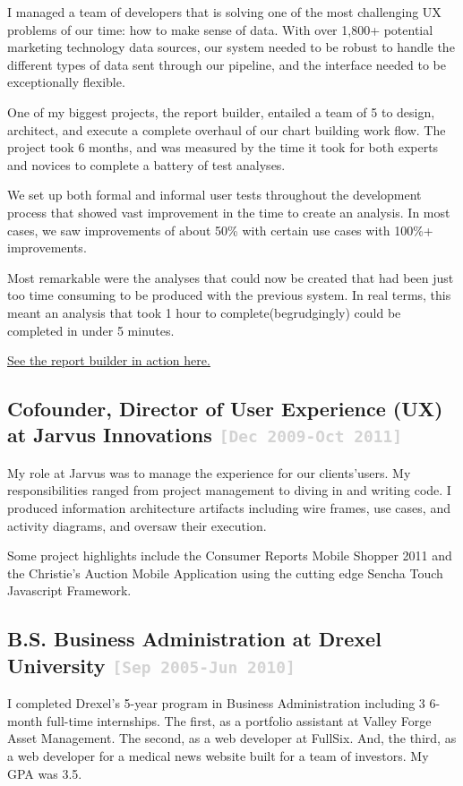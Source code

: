 \documentclass{tufte-handout}
\newcommand{\shstandout}[1]{\textbf{\textcolor{BurntOrange}{#1}}}
\newcommand{\shyears}[1]{\small{\texttt{\textcolor{LightGray}{#1}}}}
\begin{document}
I managed a team of developers that is solving one of the most challenging UX problems of our time: how to make sense of data. With over 1,800+ potential marketing technology data sources, our system needed to be robust to handle the different types of data sent through our pipeline, and the interface needed to be exceptionally flexible.

One of my biggest projects, the report builder, entailed a team of 5 to design, architect, and execute a complete overhaul of our chart building work flow. The project took 6 months, and was measured by the time it took for both experts and novices to complete a battery of test analyses.

We set up both formal and informal user tests throughout the development process that showed vast improvement in the time to create an analysis. In most cases, we saw improvements of about 50\% with certain use cases with 100\%+ improvements.

Most remarkable were the analyses that could now be created that had been just too time consuming to be produced with the previous system. In real terms, this meant an analysis that took 1 hour to complete(begrudgingly) could be completed in under 5 minutes.

\href{https://magento.com/resources/tag/product-demo\%3A-business-intelligence}{See the report builder in action here.}

\subsection{\textbf{Cofounder, Director of User Experience (UX)} at \shstandout{Jarvus Innovations} \shyears{[Dec 2009-Oct 2011]}}

My role at Jarvus was to manage the experience for our clients'​ users. My responsibilities ranged from project management to diving in and writing code. I produced information architecture artifacts including wire frames, use cases, and activity diagrams, and oversaw their execution.

Some project highlights include the Consumer Reports Mobile Shopper 2011 and the Christie's Auction Mobile Application using the cutting edge Sencha Touch Javascript Framework.


\subsection{\textbf{B.S. Business Administration} at \shstandout{Drexel University} \shyears{[Sep 2005-Jun 2010]}}
I completed Drexel's 5-year program in Business Administration including 3 6-month full-time internships. The first, as a portfolio assistant at Valley Forge Asset Management. The second, as a web developer at FullSix. And, the third, as a web developer for a medical news website built for a team of investors. My GPA was 3.5.
\end{document}
